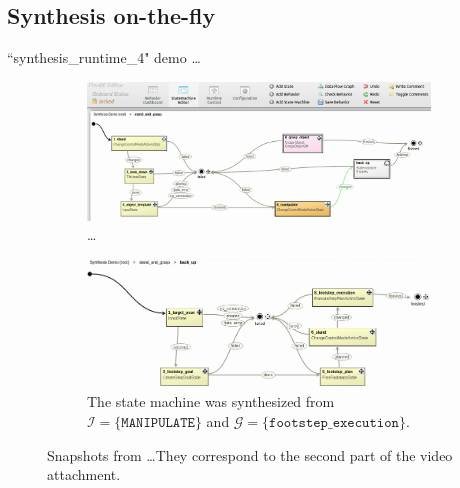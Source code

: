 
\subsection{Synthesis on-the-fly}

``synthesis\_runtime\_4" demo \ldots

\begin{figure}[t]
	\centering
	\begin{subfigure}[b]{0.99\columnwidth}
	\includegraphics[width=0.99\columnwidth, clip]{./img/synthesis_runtime_connect_sm.png}
	\caption{\ldots
	} 
	\label{Fig:runtime1}
	\end{subfigure}
	
	\vspace{4 pt}
	\begin{subfigure}[b]{0.99\columnwidth}
	\includegraphics[width=0.99\columnwidth, clip]{./img/synthesis_runtime_synthesized_sm.png}
	\caption{The state machine was synthesized from $\mathcal{I} = \{ \mathtt{MANIPULATE} \}$ and $\mathcal{G} = \{ \mathtt{footstep\_execution} \}$.
	} 
	\label{Fig:runtime2}
	\end{subfigure}
	\caption{Snapshots from \ldots They correspond to the second part of the video attachment.
	}
	\label{Fig:synthesis_runtime_demo}
\end{figure}

